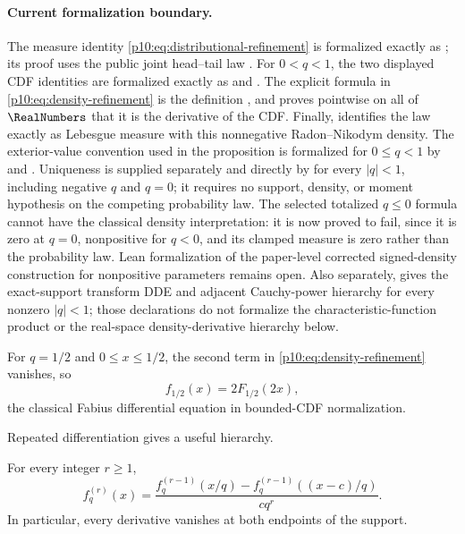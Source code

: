 \documentclass[11pt]{article}
\numberwithin{equation}{section}
\theoremstyle{definition}
\theoremstyle{remark}
\begin{document}
\paragraph{Current formalization boundary.}
The measure identity \eqref{p10:eq:distributional-refinement} is formalized exactly as
; its proof uses the public joint head--tail
law .  For \(0<q<1\), the two
displayed CDF identities are formalized exactly as
 and
.  The explicit formula in
\eqref{p10:eq:density-refinement} is the definition , and
 proves pointwise on all of \(\RealNumbers\) that it is the
derivative of the CDF.  Finally,
 identifies the law exactly as Lebesgue
measure with this nonnegative Radon--Nikodym density.  The exterior-value convention used
in the proposition is formalized for \(0\le q<1\) by
 and
.  Uniqueness is supplied separately and directly
by  for every \(|q|<1\), including
negative \(q\) and \(q=0\); it requires no support, density, or moment hypothesis on the
competing probability law.  The selected totalized \(q\le0\) formula cannot have the
classical density interpretation: it is now proved to fail, since it is
zero at \(q=0\), nonpositive for \(q<0\), and its clamped  measure is
zero rather than the probability law.  Lean formalization of the paper-level corrected
signed-density construction for nonpositive parameters remains open.  Also separately,
 gives the exact-support transform DDE and adjacent
Cauchy-power hierarchy for every nonzero \(|q|<1\); those declarations do not formalize
the characteristic-function product or the real-space density-derivative hierarchy below.

For $q=1/2$ and $0\le x\le1/2$, the second term in
\eqref{p10:eq:density-refinement} vanishes, so
\[
 f_{1/2}(x)=2F_{1/2}(2x),
\]
the classical Fabius differential equation in bounded-CDF normalization.

Repeated differentiation gives a useful hierarchy.

\begin{corollary}
\label{p10:cor:derivative-refinement}
For every integer $r\ge1$,
\begin{equation}
 f_q^{(r)}(x)
 =\frac{f_q^{(r-1)}(x/q)-f_q^{(r-1)}((x-c)/q)}{c q^r}.         \label{p10:eq:derivative-refinement}
\end{equation}
In particular, every derivative vanishes at both endpoints of the support.
\end{corollary}
\end{document}
